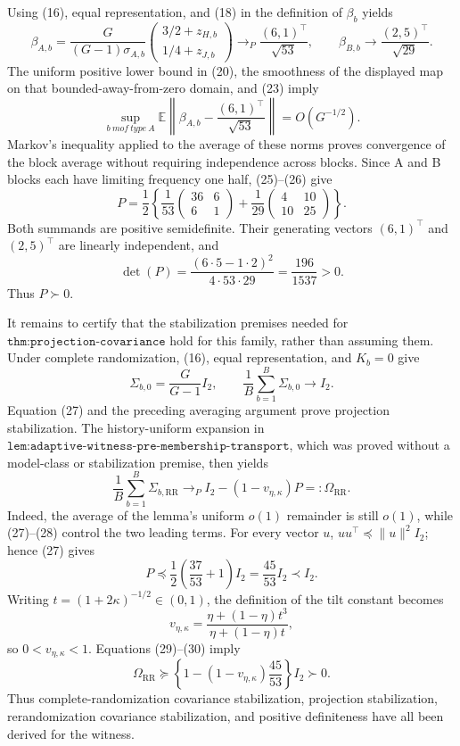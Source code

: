 Using (16), equal representation, and (18) in the definition of \(\beta_b\) yields
\[
\beta_{A,b}
=\frac{G}{(G-1)\sigma_{A,b}}
  \begin{pmatrix}3/2+z_{H,b}\\[2pt]1/4+z_{J,b}\end{pmatrix}
\longrightarrow_P\frac{(6,1)^\top}{\sqrt{53}},
\qquad
\beta_{B,b}\longrightarrow\frac{(2,5)^\top}{\sqrt{29}}. \tag{25}
\]
The uniform positive lower bound in (20), the smoothness of the displayed map on that bounded-away-from-zero domain, and (23) imply
\[
\sup_{b\ {
m of\ type\ A}}
\mathbb E\left\|\beta_{A,b}-\frac{(6,1)^\top}{\sqrt{53}}\right\|
=O(G^{-1/2}).                                               \tag{26}
\]
Markov's inequality applied to the average of these norms proves convergence of the block average without requiring independence across blocks.  Since A and B blocks each have limiting frequency one half, (25)--(26) give
\[
P=\frac12\left\{
\frac1{53}\begin{pmatrix}36&6\\6&1\end{pmatrix}
+\frac1{29}\begin{pmatrix}4&10\\10&25\end{pmatrix}
\right\}.                                                  \tag{27}
\]
Both summands are positive semidefinite.  Their generating vectors \((6,1)^\top\) and \((2,5)^\top\) are linearly independent, and
\[
\det(P)=\frac{(6\cdot5-1\cdot2)^2}{4\cdot53\cdot29}
=\frac{196}{1537}>0.
\]
Thus \(P\succ0\).

It remains to certify that the stabilization premises needed for \(\texttt{thm:projection-covariance}\) hold for this family, rather than assuming them.  Under complete randomization, (16), equal representation, and \(K_b=0\) give
\[
\Sigma_{b,0}=\frac G{G-1}I_2,
\qquad
\frac1B\sum_{b=1}^B\Sigma_{b,0}\longrightarrow I_2.     \tag{28}
\]
Equation (27) and the preceding averaging argument prove projection stabilization.  The history-uniform expansion in \(\texttt{lem:adaptive-witness-pre-membership-transport}\), which was proved without a model-class or stabilization premise, then yields
\[
\frac1B\sum_{b=1}^B\Sigma_{b,\mathrm{RR}}
\longrightarrow_P I_2-(1-v_{\eta,\kappa})P
=:\Omega_{\mathrm{RR}}.                                  \tag{29}
\]
Indeed, the average of the lemma's uniform \(o(1)\) remainder is still \(o(1)\), while (27)--(28) control the two leading terms.  For every vector \(u\), \(uu^\top\preceq\|u\|^2I_2\); hence (27) gives
\[
P\preceq\frac12\left(\frac{37}{53}+1\right)I_2
=\frac{45}{53}I_2\prec I_2.                              \tag{30}
\]
Writing \(t=(1+2\kappa)^{-1/2}\in(0,1)\), the definition of the tilt constant becomes
\[
v_{\eta,\kappa}=\frac{\eta+(1-\eta)t^3}{\eta+(1-\eta)t},
\]
so \(0<v_{\eta,\kappa}<1\).  Equations (29)--(30) imply
\[
\Omega_{\mathrm{RR}}
\succeq\left\{1-(1-v_{\eta,\kappa})\frac{45}{53}\right\}I_2
\succ0.                                                    \tag{31}
\]
Thus complete-randomization covariance stabilization, projection stabilization, rerandomization covariance stabilization, and positive definiteness have all been derived for the witness.

